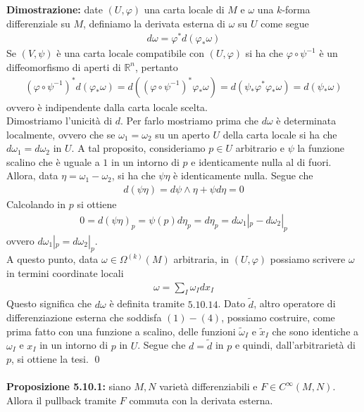 \documentclass{article}
\begin{document}
\textbf{Dimostrazione:} date $(U, \varphi)$ una carta locale di $M$ e $\omega$ una $k$-forma differenziale su $M$, definiamo la derivata esterna di $\omega$ su $U$ come segue
\begin{align*}
    d\omega = \varphi^*d(\varphi_*\omega) \tag{5.10.15}
\end{align*}
Se $(V, \psi)$ è una carta locale compatibile con $(U, \varphi)$ si ha che $\varphi \circ \psi^{-1}$ è un diffeomorfismo di aperti di $\mathbb{R}^n$, pertanto
\begin{align*}
    (\varphi \circ \psi^{-1})^*d(\varphi_*\omega) = d((\varphi \circ \psi^{-1})^*\varphi_*\omega) = d(\psi_*\varphi^*\varphi_*\omega) = d(\psi_*\omega) \tag{5.10.16}
\end{align*}
ovvero è indipendente dalla carta locale scelta. \\
Dimostriamo l'unicità di $d$. Per farlo mostriamo prima che $d\omega$ è determinata localmente, ovvero che se $\omega_1 = \omega_2$ su un aperto $U$ della carta locale si ha che $d\omega_1 = d\omega_2$ in $U$. A tal proposito, consideriamo $p \in U$ arbitrario e $\psi$ la funzione scalino che è uguale a $1$ in un intorno di $p$ e identicamente nulla al di fuori. Allora, data $\eta = \omega_1 - \omega_2$, si ha che $\psi\eta$ è identicamente nulla. Segue che
\begin{align*}
    d(\psi\eta) = d\psi \wedge \eta + \psi d\eta = 0 \tag{5.10.17}
\end{align*}
Calcolando in $p$ si ottiene
\begin{align*}
    0 = d(\psi\eta)_p = \psi(p)d\eta_p = d\eta_p = d\omega_1|_p - d\omega_2|_p \tag{5.10.18}
\end{align*}
ovvero $d\omega_1|_p = d\omega_2|_p$. \\
A questo punto, data $\omega \in \Omega^{(k)}(M)$ arbitraria, in $(U, \varphi)$ possiamo scrivere $\omega$ in termini coordinate locali
\begin{align*}
    \omega = \sum_I \omega_I dx_I \tag{5.10.19}
\end{align*}
Questo significa che $d\omega$ è definita tramite $5.10.14$. Dato $\widetilde{d}$, altro operatore di differenziazione esterna che soddisfa $(1)-(4)$, possiamo costruire, come prima fatto con una funzione a scalino, delle funzioni $\widetilde{\omega}_I$ e $\widetilde{x}_I$ che sono identiche a $\omega_I$ e $x_I$ in un intorno di $p$ in $U$. Segue che $d = \widetilde{d}$ in $p$ e quindi, dall'arbitrarietà di $p$, si ottiene la tesi. \qed \\ \\
\textbf{Proposizione 5.10.1:} siano $M, N$ varietà differenziabili e $F \in C^\infty(M, N)$. Allora il pullback tramite $F$ commuta con la derivata esterna. \\
\end{document}
